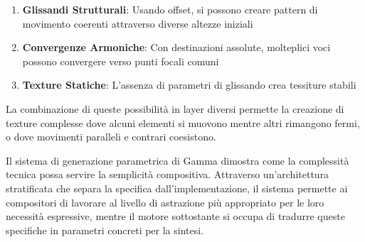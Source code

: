 \begin{enumerate}
    \item \textbf{Glissandi Strutturali}: Usando offset, si possono creare pattern di movimento coerenti attraverso diverse altezze iniziali
    \item \textbf{Convergenze Armoniche}: Con destinazioni assolute, molteplici voci possono convergere verso punti focali comuni
    \item \textbf{Texture Statiche}: L'assenza di parametri di glissando crea tessiture stabili
\end{enumerate}
La combinazione di queste possibilità in layer diversi permette la creazione di texture complesse dove alcuni elementi si muovono mentre altri rimangono fermi, o dove movimenti paralleli e contrari coesistono.

Il sistema di generazione parametrica di Gamma dimostra come la complessità tecnica possa servire la semplicità compositiva. Attraverso un'architettura stratificata che separa la specifica dall'implementazione, il sistema permette ai compositori di lavorare al livello di astrazione più appropriato per le loro necessità espressive, mentre il motore sottostante si occupa di tradurre queste specifiche in parametri concreti per la sintesi.